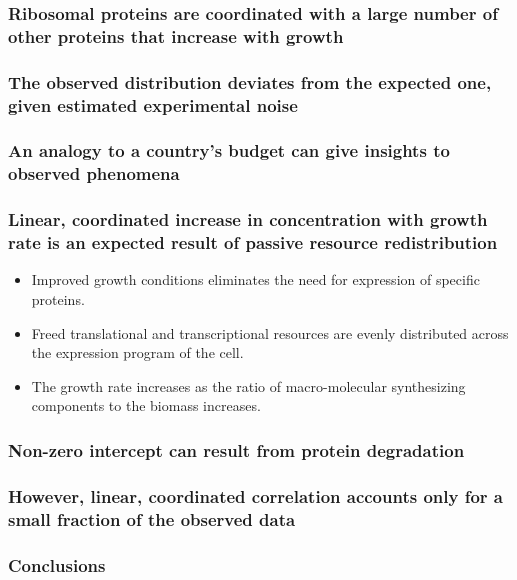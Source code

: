 \documentclass{beamer}
\begin{document}
\begin{frame}
\frametitle{Ribosomal proteins are coordinated with a large number of other proteins that increase with growth}
\end{frame}

\begin{frame}
\frametitle{The observed distribution deviates from the expected one, given estimated experimental noise}
\end{frame}

\begin{frame}
\frametitle{An analogy to a country's budget can give insights to observed phenomena}
\end{frame}

\begin{frame}
\frametitle{Linear, coordinated increase in concentration with growth rate is an expected result of passive resource redistribution}
\begin{itemize}
\item Improved growth conditions eliminates the need for expression of specific proteins.
\item Freed translational and transcriptional resources are evenly distributed across the expression program of the cell.
\item The growth rate increases as the ratio of macro-molecular synthesizing components to the biomass increases.
\end{itemize}
\end{frame}

\begin{frame}
\frametitle{Non-zero intercept can result from protein degradation}
\end{frame}

\begin{frame}
\frametitle{However, linear, coordinated correlation accounts only for a small fraction of the observed data}
\end{frame}
\begin{frame}
\frametitle{Conclusions}
\end{frame}
\end{document}
